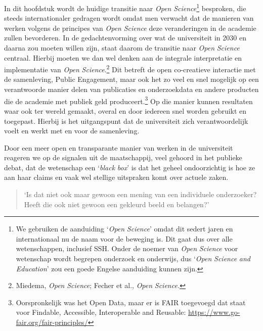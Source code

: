 \documentclass[smallauthor, chapterhaspagenum, nochapterinheader, pagenuminheader,  bigchapnum,medium2, tocpages, garamond, titleinheader]{jote-book}
\begin{document}
	In dit hoofdstuk wordt de huidige transitie naar \emph{Open }\emph{Science}\footnote{We gebruiken de aanduiding ‘\emph{Open }\emph{Science}' omdat dit sedert jaren en internationaal nu de naam voor de beweging is. Dit gaat dus over alle wetenschappen, inclusief SSH. Onder de noemer van \emph{Open }\emph{Science} voor wetenschap wordt begrepen onderzoek en onderwijs, dus ‘\emph{Open }\emph{Science}\emph{ }\emph{and}\emph{ }\emph{Education}' zou een goede Engelse aanduiding kunnen zijn.} besproken, die steeds internationaler gedragen wordt omdat men verwacht dat de manieren van werken volgens de principes van \emph{Open }\emph{Science} deze veranderingen in de academie zullen bevorderen. In de gedachtenvorming over wat de universiteit in 2030 en daarna zou moeten willen zijn, staat daarom de transitie naar \emph{Open }\emph{Science} centraal. Hierbij moeten we dan wel denken aan de integrale interpretatie en implementatie van \emph{Open }\emph{Science}.\footnote{Miedema, \emph{Open }\emph{Science}; Fecher et al., \emph{Open }\emph{Science}\emph{.}} Dit betreft de open co-creatieve interactie met de samenleving, Public Engagement, maar ook het zo veel en snel mogelijk op een verantwoorde manier delen van publicaties en onderzoekdata en andere producten die de academie met publiek geld produceert.\footnote{Oorspronkelijk was het Open Data, maar er is FAIR toegevoegd dat staat voor Findable, Accessible, Interoperable and Reusable: \href{https://www.go-fair.org/fair-principles/}{https://www.go-fair.org/fair-principles/}} Op die manier kunnen resultaten waar ook ter wereld gemaakt, overal en door iedereen snel worden gebruikt en toegepast. Hierbij is het uitgangspunt dat de universiteit zich verantwoordelijk voelt en werkt met en voor de samenleving.



	Door een meer open en transparante manier van werken in de universiteit reageren we op de signalen uit de maatschappij, veel gehoord in het publieke debat, dat de wetenschap een ‘\emph{black}\emph{ }\emph{box}' is dat het geheel ondoorzichtig is hoe ze aan haar claims en vaak wel stellige uitspraken komt over actuele zaken.\emph{ }

	\begin{quote}
		\itshape

		‘Is dat niet ook maar gewoon een mening van een individuele onderzoeker? Heeft die ook niet gewoon een gekleurd beeld en belangen?'
	\end{quote}
\end{document}
